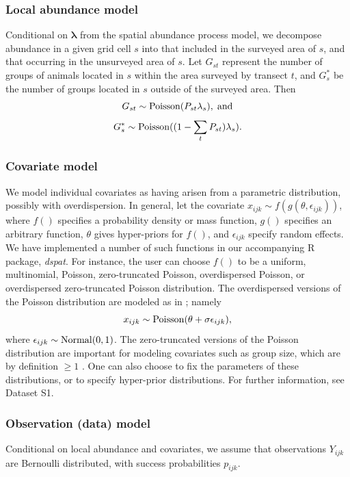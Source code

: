 \documentclass[10pt]{article}
\begin{document}
\subsubsection*{Local abundance model}
Conditional on $\boldsymbol{\lambda}$ from the spatial abundance process model, we decompose abundance in a given grid cell $s$ into that included in the surveyed area of $s$, and that occurring in the unsurveyed area of $s$.  Let $G_{st}$ represent the number of groups of animals located in $s$ within the area surveyed by transect $t$, and $G_s^*$ be the number of groups located in $s$ outside of the surveyed area.  Then
$$
  G_{st} \sim {\rm Poisson}(P_{st} \lambda_s), \hspace{1mm} {\rm and}
$$
$$
  G_s^* \sim {\rm Poisson}((1-\sum_t P_{st}) \lambda_s).
$$

\subsubsection*{Covariate model}

We model individual covariates as having arisen from a parametric distribution, possibly with overdispersion.  In general, let the covariate $x_{ijk} \sim f(g(\theta,\epsilon_{ijk}))$, where $f()$ specifies a probability density or mass function, $g()$ specifies an arbitrary function, $\theta$ gives hyper-priors for $f()$, and $\epsilon_{ijk}$ specify random effects.  We have implemented a number of such functions in our accompanying R package, \emph{dspat}.  For instance, the user can choose $f()$ to be a uniform, multinomial, Poisson, zero-truncated Poisson, overdispersed Poisson, or overdispersed zero-truncated Poisson distribution.  The overdispersed versions of the Poisson distribution are modeled as in \cite{McClintockEtAl2009}; namely
$$
x_{ijk} \sim {\rm Poisson}(\theta+\sigma \epsilon_{ijk}),
$$
where $\epsilon_{ijk} \sim {\rm Normal}(0,1)$.
The zero-truncated versions of the Poisson distribution are important for modeling covariates such as group size, which are by definition $\ge 1$ \cite{Royle2008}.
One can also choose to fix the parameters of these distributions, or to specify hyper-prior distributions.  For further information, see Dataset S1.

\subsubsection*{Observation (data) model}

Conditional on local abundance and covariates, we assume that observations $Y_{ijk}$ are Bernoulli distributed, with success probabilities $p_{ijk}$.
\end{document}
